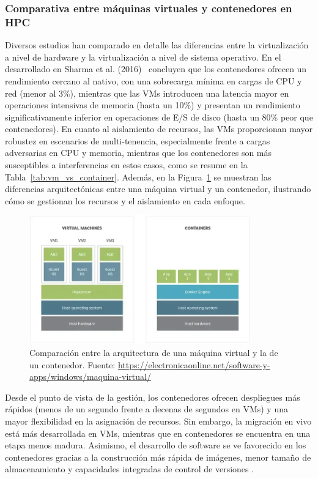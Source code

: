 \subsubsection{Comparativa entre máquinas virtuales y contenedores en HPC}

Diversos estudios han comparado en detalle las diferencias entre la virtualización a nivel de hardware y la virtualización a nivel de sistema operativo. En el desarrollado en Sharma et al. (2016)~\cite{sharma2016containers} concluyen que los contenedores ofrecen un rendimiento cercano al nativo, con una sobrecarga mínima en cargas de CPU y red (menor al 3\%), mientras que las VMs introducen una latencia mayor en operaciones intensivas de memoria (hasta un 10\%) y presentan un rendimiento significativamente inferior en operaciones de E/S de disco (hasta un 80\% peor que contenedores). En cuanto al aislamiento de recursos, las VMs proporcionan mayor robustez en escenarios de multi-tenencia, especialmente frente a cargas adversarias en CPU y memoria, mientras que los contenedores son más susceptibles a interferencias en estos casos, como se resume en la Tabla~\ref{tab:vm_vs_container}. Además, en la Figura~\ref{fig:vm_vs_container} se muestran las diferencias arquitectónicas entre una máquina virtual y un contenedor, ilustrando cómo se gestionan los recursos y el aislamiento en cada enfoque.

\begin{figure}[ht]
    \centering
    \includegraphics[width=0.85\textwidth]{imagenes/cap3/maquina-virtual-vs-contenedor.png}
    \caption{Comparación entre la arquitectura de una máquina virtual y la de un contenedor. Fuente: \url{https://electronicaonline.net/software-y-apps/windows/maquina-virtual/}}
    \label{fig:vm_vs_container}
\end{figure}

Desde el punto de vista de la gestión, los contenedores ofrecen despliegues más rápidos (menos de un segundo frente a decenas de segundos en VMs) y una mayor flexibilidad en la asignación de recursos. Sin embargo, la migración en vivo está más desarrollada en VMs, mientras que en contenedores se encuentra en una etapa menos madura. Asimismo, el desarrollo de software se ve favorecido en los contenedores gracias a la construcción más rápida de imágenes, menor tamaño de almacenamiento y capacidades integradas de control de versiones \cite{sharma2016containers}.

